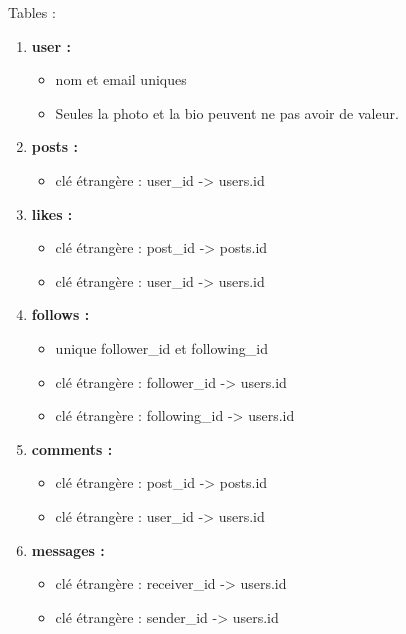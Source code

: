 \documentclass[12pt,a4paper]{article}
\begin{document}
Tables :
\begin{enumerate}
     


\item \textbf{user :}
  
  \begin{itemize}
    
  \item nom et email uniques
  \item Seules la photo et la bio peuvent ne pas avoir de valeur.
  
  \end{itemize}

\item \textbf{posts :}
  
  \begin{itemize}
    
  \item clé étrangère : user\_id -> users.id
  
  \end{itemize}

\item \textbf{likes :}
  
  \begin{itemize}
    
  \item clé étrangère : post\_id -> posts.id
  \item clé étrangère : user\_id -> users.id
  
  \end{itemize}

\item \textbf{follows :}
  
  \begin{itemize}

  \item unique follower\_id et following\_id
  \item clé étrangère : follower\_id -> users.id
  \item clé étrangère : following\_id -> users.id
  
  \end{itemize}

\item \textbf{comments :}
  
  \begin{itemize}
    
  \item clé étrangère : post\_id -> posts.id
  \item clé étrangère : user\_id -> users.id
  
  \end{itemize}

\item \textbf{messages :}
  
  \begin{itemize}
    
  \item clé étrangère : receiver\_id -> users.id
  \item clé étrangère : sender\_id -> users.id
  
  \end{itemize}
    
\end{enumerate}
\end{document}

